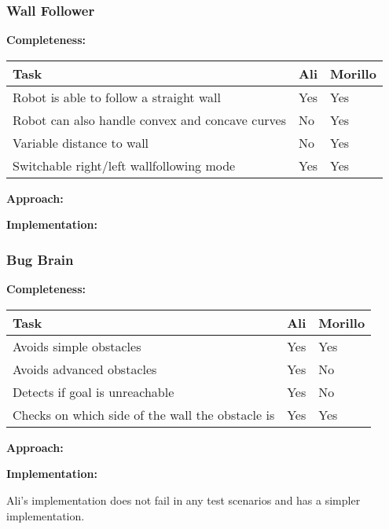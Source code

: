 \documentclass{beamer}
\begin{document}
\begin{frame}
  \frametitle{Wall Follower}


 \textbf{Completeness:}
    \begin{center}
      \begin{tabular}{| p{4cm} | p{2.7cm} | p{2.7cm} | }
      \hline
	\textbf{Task}  & \textbf{Ali} & \textbf{Morillo}\\ \hline
	Robot is able to follow a straight wall & Yes & Yes\\  \hline
	Robot can also handle convex and concave curves & No & Yes\\  \hline
	Variable distance to wall & No & Yes\\  \hline
	Switchable right/left wallfollowing mode & Yes & Yes\\  \hline
      \end{tabular}
  \end{center}
  \textbf{Approach:}
  \begin{center}
  \end{center}
  
  \textbf{Implementation:}
  \begin{center}
  \end{center}
\end{frame}


\begin{frame}
  \frametitle{Bug Brain}


 \textbf{Completeness:}
    \begin{center}
      \begin{tabular}{| p{4cm} | p{2.7cm} | p{2.7cm} | }
      \hline
	\textbf{Task}  & \textbf{Ali} & \textbf{Morillo}\\ \hline
	Avoids simple obstacles & Yes & Yes\\  \hline
	Avoids advanced obstacles & Yes & No\\  \hline
	Detects if goal is unreachable & Yes & No\\  \hline
	Checks on which side of the wall the obstacle is & Yes & Yes\\  \hline
      \end{tabular}
  \end{center}
  \textbf{Approach:}
  \begin{center}
  \end{center}
  
  \textbf{Implementation:}
  \begin{center}
   Ali's implementation does not fail in any test scenarios and has a simpler implementation.
  \end{center}
\end{frame}
\end{document}
